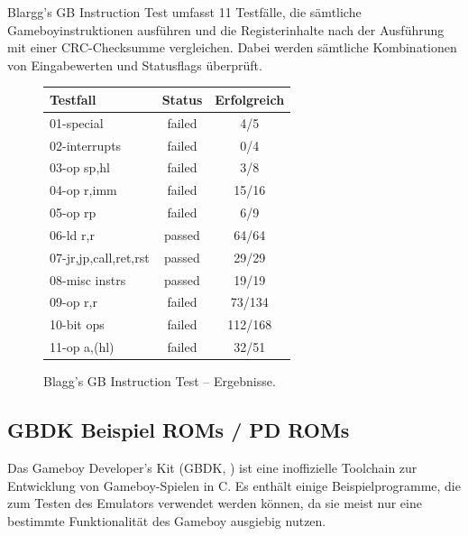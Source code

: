 \documentclass[a4paper]{scrartcl}
\begin{document}
Blargg's GB Instruction Test \cite{test_roms} umfasst 11 Testfälle, die sämtliche Gameboyinstruktionen ausführen und die Registerinhalte nach der Ausführung mit einer CRC-Checksumme vergleichen. Dabei werden sämtliche Kombinationen von Eingabewerten und Statusflags überprüft.

\begin{figure}[H]
\centering
\begin{tabular}{l|c|c}
Testfall&Status&Erfolgreich \\
\hline
01-special&failed&4/5 \\
02-interrupts&failed&0/4 \\
03-op sp,hl&failed&3/8 \\
04-op r,imm&failed&15/16 \\
05-op rp&failed&6/9 \\
06-ld r,r&passed&64/64 \\
07-jr,jp,call,ret,rst&passed&29/29 \\
08-misc instrs&passed&19/19 \\
09-op r,r&failed&73/134 \\
10-bit ops&failed&112/168 \\
11-op a,(hl)&failed&32/51
\end{tabular}
\caption{Blagg's GB Instruction Test -- Ergebnisse.}
\label{tab:inst_test}
\end{figure}

\pagebreak
\subsection{GBDK Beispiel ROMs / PD ROMs}

Das Gameboy Developer's Kit (GBDK, \cite{gbdk}) ist eine inoffizielle Toolchain zur Entwicklung von Gameboy-Spielen in C. Es enthält einige Beispielprogramme, die zum Testen des Emulators verwendet werden können, da sie meist nur eine bestimmte Funktionalität des Gameboy ausgiebig nutzen.
\end{document}
